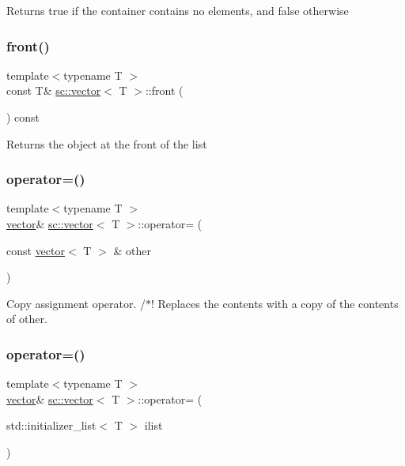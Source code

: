 Returns true if the container contains no elements, and false otherwise \mbox{\label{classsc_1_1vector_a85da6164a082030bd04de354d657da0d}} 
\subsubsection{\texorpdfstring{front()}{front()}}
{\footnotesize\ttfamily template$<$typename T $>$ \\
const T\& \hyperlink{classsc_1_1vector}{sc\+::vector}$<$ T $>$\+::front (\begin{DoxyParamCaption}{ }\end{DoxyParamCaption}) const\hspace{0.3cm}{\ttfamily [inline]}}

Returns the object at the front of the list \mbox{\label{classsc_1_1vector_ac645bc2fa1244d211c9ceecb68d4d539}} 
\subsubsection{\texorpdfstring{operator=()}{operator=()}\hspace{0.1cm}{\footnotesize\ttfamily [1/2]}}
{\footnotesize\ttfamily template$<$typename T $>$ \\
\hyperlink{classsc_1_1vector}{vector}\& \hyperlink{classsc_1_1vector}{sc\+::vector}$<$ T $>$\+::operator= (\begin{DoxyParamCaption}\item[{const \hyperlink{classsc_1_1vector}{vector}$<$ T $>$ \&}]{other }\end{DoxyParamCaption})\hspace{0.3cm}{\ttfamily [inline]}}

Copy assignment operator. /$\ast$! Replaces the contents with a copy of the contents of other. \mbox{\label{classsc_1_1vector_a757984cf36675541db735350d227d609}} 
\subsubsection{\texorpdfstring{operator=()}{operator=()}\hspace{0.1cm}{\footnotesize\ttfamily [2/2]}}
{\footnotesize\ttfamily template$<$typename T $>$ \\
\hyperlink{classsc_1_1vector}{vector}\& \hyperlink{classsc_1_1vector}{sc\+::vector}$<$ T $>$\+::operator= (\begin{DoxyParamCaption}\item[{std\+::initializer\+\_\+list$<$ T $>$}]{ilist }\end{DoxyParamCaption})\hspace{0.3cm}{\ttfamily [inline]}}

